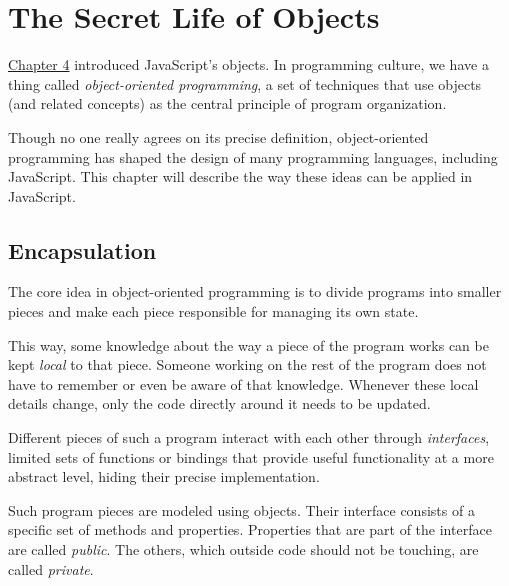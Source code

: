 \chapter{The Secret Life of Objects}\label{object}


\hyperref[data]{Chapter 4} introduced JavaScript's objects. In programming culture, we have a thing called \emph{object-oriented programming}, a set of techniques that use objects (and related concepts) as the central principle of program organization.

Though no one really agrees on its precise definition, object-oriented programming has shaped the design of many programming languages, including JavaScript. This chapter will describe the way these ideas can be applied in JavaScript.

\section{Encapsulation}

The core idea in object-oriented programming is to divide programs into smaller pieces and make each piece responsible for managing its own state.

This way, some knowledge about the way a piece of the program works can be kept \emph{local} to that piece. Someone working on the rest of the program does not have to remember or even be aware of that knowledge. Whenever these local details change, only the code directly around it needs to be updated.

\label{object.interface}Different pieces of such a program interact with each other through \emph{interfaces}, limited sets of functions or bindings that provide useful functionality at a more abstract level, hiding their precise implementation.

Such program pieces are modeled using objects. Their interface consists of a specific set of methods and properties. Properties that are part of the interface are called \emph{public}. The others, which outside code should not be touching, are called \emph{private}.

